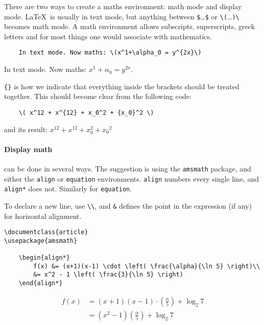 There are two ways to create a maths environment: math mode and display mode.
\LaTeX\ is usually in text mode, but anything between \verb|$|\dots\verb|$| or \verb|\(|\dots \verb|)\| becomes math mode.
A math environment allows subscripts, superscripts, greek letters and for most things one would associate with mathematics.
\begin{lstlisting}
    In text mode. Now maths: \(x^1+\alpha_0 = y^{2x}\)
\end{lstlisting}

In text mode. Now maths: \(x^1+\alpha_0 = y^{2x}\).

\verb|{}| is how we indicate that everything inside the brackets should be treated together.
This should become clear from the following code:
\begin{lstlisting}
    \( x^12 + x^{12} + x_0^2 + {x_0}^2 \)
\end{lstlisting}
and its result: \( x^12 + x^{12} + x_0^2 + {x_0}^2 \)

\paragraph{Display math} can be done in several ways.
The suggestion is using the \verb|amsmath| package, and either the \verb|align| or \verb|equation| environments.
\texttt{align} numbers every single line, and \texttt{align*} does not. Similarly for \verb|equation|.

To declare a new line, use \verb|\\|, and \verb|&| defines the point in the expression (if any) for horizontal alignment.
\begin{lstlisting}
\documentclass{article}
\usepackage{amsmath}

    \begin{align*}
        f(x) &= (x+1)(x-1) \cdot \left( \frac{\alpha}{\ln 5} \right)\\
        &= x^2 - 1 \left( \frac{3}{\ln 5} \right)
    \end{align*}

\end{lstlisting}
\begin{align*}
    f(x) &= (x+1)(x-1) \cdot \left( \frac{\alpha}{5} \right) + \log_{2} 7\\
    &= (x^2 - 1)  (\frac{\alpha}{5} ) + \log_{2} 7
\end{align*}

